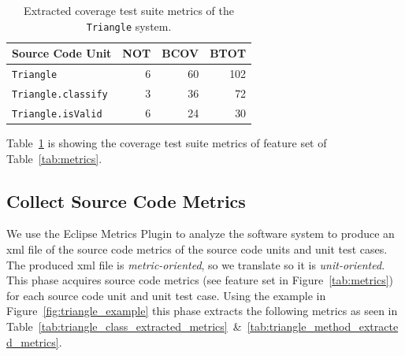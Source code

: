 \begin{table}[h]
  \centering
  \begin{tabular}{|l|r|r|r|}
    \hline
    \rowcolor[RGB]{169,196,223}
    \textbf{Source Code Unit} & \textbf{NOT} & \textbf{BCOV} & \textbf{BTOT} \\
    \hline \texttt{Triangle} & 6 & 60 & 102 \\
    \hline \texttt{Triangle.classify} & 3 & 36 & 72 \\
    \hline \texttt{Triangle.isValid} & 6 & 24 & 30 \\
    \hline
  \end{tabular}
  \caption{Extracted coverage test suite metrics of the \texttt{Triangle} system.}
  \vspace{1mm}
  \footnotesize{Table~\ref{tab:triangle_coverage_metrics} is showing the coverage test suite metrics of feature set  of Table~\ref{tab:metrics}.}
  \vspace{1mm}
  \label{tab:triangle_coverage_metrics}
\end{table}


\subsection{Collect Source Code Metrics}
\label{subsec:appraoch_collect_source_metrics}
We use the Eclipse Metrics Plugin to analyze the software system to produce an \gls{xml} file of the source code metrics of the source code units and unit test cases. The produced \gls{xml} file is \emph{metric-oriented}, so we translate so it is \emph{unit-oriented}. This phase acquires source code metrics (see feature set  in Figure~\ref{tab:metrics}) for each source code unit and unit test case. Using the example in Figure~\ref{fig:triangle_example} this phase extracts the following metrics as seen in Table~\ref{tab:triangle_class_extracted_metrics}~\&~\ref{tab:triangle_method_extracted_metrics}.

